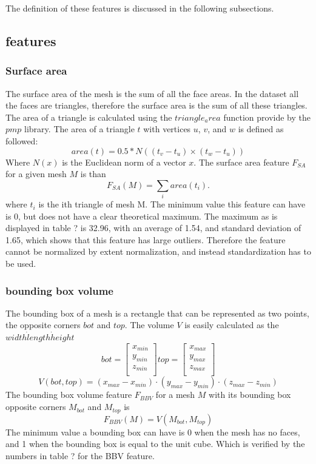 \documentclass{bigdata}
\begin{document}
The definition of these features is discussed in the following subsections.
\subsection{ features}

\subsubsection{Surface area}
The surface area of the mesh is the sum of all the face areas. In the dataset all the faces are triangles, therefore the surface area is the sum of all these triangles. The area of a triangle is calculated using the $triangle_area$ function provide by the $pmp$ library. The area of a triangle $t$ with vertices $u$, $v$, and $w$ is defined as followed:
\begin{equation}
area(t) = 0.5 * N((t_v-t_u) \times (t_w-t_u))
\end{equation}
Where $N(x)$ is the Euclidean norm of a vector $x$. The surface area feature $F_{SA}$ for a given mesh $M$ is than
\begin{equation}
F_{SA}(M) = \sum\limits_{i} area(t_i).
\end{equation}
where $t_i$ is the ith triangle of mesh M. The minimum value this feature can have is 0, but does not have a clear theoretical maximum. The maximum as is displayed in table ? is 32.96, with an average of 1.54, and standard deviation of 1.65, which shows that this feature has large outliers. Therefore the feature cannot be normalized by extent normalization, and instead standardization has to be used. 

\subsubsection{bounding box volume}
The bounding box of a mesh is a rectangle that can be represented as two points, the opposite corners $bot$ and $top$. The volume $V$ is easily calculated as the $width \dot length \dot height$
\[
bot =
\begin{bmatrix}
x_{min} \\
y_{min} \\
z_{min} \\
\end{bmatrix}
top =
\begin{bmatrix}
x_{max} \\
y_{max} \\
z_{max} \\
\end{bmatrix}
\]
\begin{equation}
V(bot,top) = (x_{max} - x_{min}) \cdot (y_{max}-y_{min}) \cdot (z_{max}-z_{min})
\end{equation}
The bounding box volume feature $F_{BBV}$ for a mesh $M$ with its bounding box opposite corners $M_{bot}$ and $M_{top}$ is
\begin{equation}
F_{BBV}(M) = V(M_{bot},M_{top})
\end{equation}
The minimum value a bounding box can have is 0 when the mesh has no faces, and 1 when the bounding box is equal to the unit cube. Which is verified by the numbers in table ? for the BBV feature. 
\end{document}
